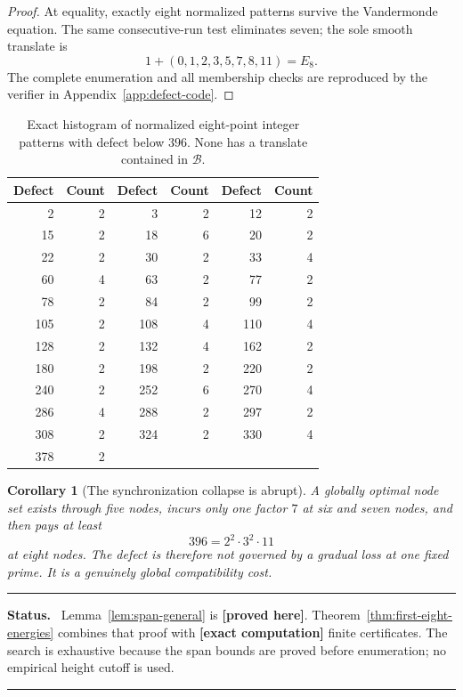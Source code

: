 \documentclass[11pt,oneside]{article}
\newtheorem{corollary}[theorem]{Corollary}
\theoremstyle{definition}
\theoremstyle{remark}
\newcommand{\B}{\mathcal B}
\newcommand{\statusproved}{\textcolor{newgreen}{\textbf{[proved here]}}}
\newcommand{\statuscomputed}{\textcolor{compviolet}{\textbf{[exact computation]}}}
\newenvironment{statusbox}
{\begin{center}\begin{minipage}{0.94\textwidth}\raggedright\hrule
\vspace{0.42em}\textbf{Status.}\ }
{\par\vspace{0.32em}\hrule\end{minipage}\end{center}}
\begin{document}
\begin{proof}
At equality, exactly eight normalized patterns survive the Vandermonde equation.  The same
consecutive-run test eliminates seven; the sole smooth translate is
\[
 1+(0,1,2,3,5,7,8,11)=E_8.
\]
The complete enumeration and all membership checks are reproduced by the verifier in
Appendix~\ref{app:defect-code}.
\end{proof}

\begin{table}[ht]
\centering
\small
\begin{tabular}{@{}r r@{\qquad}r r@{\qquad}r r@{}}
\toprule
Defect&Count&Defect&Count&Defect&Count\\
\midrule
2&2&3&2&12&2\\
15&2&18&6&20&2\\
22&2&30&2&33&4\\
60&4&63&2&77&2\\
78&2&84&2&99&2\\
105&2&108&4&110&4\\
128&2&132&4&162&2\\
180&2&198&2&220&2\\
240&2&252&6&270&4\\
286&4&288&2&297&2\\
308&2&324&2&330&4\\
378&2&&&\\
\bottomrule
\end{tabular}
\caption{Exact histogram of normalized eight-point integer patterns with defect below
\(396\).  None has a translate contained in \(\B\).}
\label{tab:defect-eight-histogram}
\end{table}

\begin{corollary}[The synchronization collapse is abrupt]
\label{cor:synchronization-collapse}
A globally optimal node set exists through five nodes, incurs only one factor \(7\) at six and
seven nodes, and then pays at least
\[
 396=2^2\cdot3^2\cdot11
\]
at eight nodes.  The defect is therefore not governed by a gradual loss at one fixed prime.
It is a genuinely global compatibility cost.
\end{corollary}

\begin{statusbox}
Lemma~\ref{lem:span-general} is \statusproved.  Theorem~\ref{thm:first-eight-energies} combines
that proof with \statuscomputed{} finite certificates.  The search is exhaustive because the
span bounds are proved before enumeration; no empirical height cutoff is used.
\end{statusbox}
\end{document}
